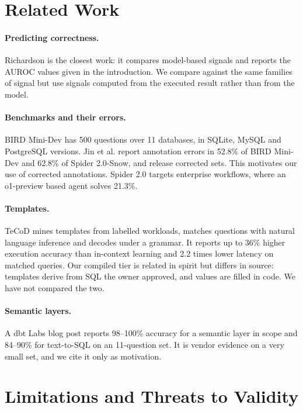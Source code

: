 \documentclass[10pt,twocolumn]{article}
\begin{document}
\section{Related Work}
\paragraph{Predicting correctness.} Richardson \cite{richardson2026} is the closest work: it compares model-based signals and reports the AUROC values given in the introduction. We compare against the same families of signal but use signals computed from the executed result rather than from the model.

\paragraph{Benchmarks and their errors.} BIRD Mini-Dev \cite{birdminidev} has 500 questions over 11 databases, in SQLite, MySQL and PostgreSQL versions. Jin et al. \cite{jin2026} report annotation errors in 52.8\% of BIRD Mini-Dev and 62.8\% of Spider 2.0-Snow, and release corrected sets. This motivates our use of corrected annotations. Spider 2.0 \cite{lei2025} targets enterprise workflows, where an o1-preview based agent solves 21.3\%.

\paragraph{Templates.} TeCoD \cite{jivani2026} mines templates from labelled workloads, matches questions with natural language inference and decodes under a grammar. It reports up to 36\% higher execution accuracy than in-context learning and 2.2 times lower latency on matched queries. Our compiled tier is related in spirit but differs in source: templates derive from SQL the owner approved, and values are filled in code. We have not compared the two.

\paragraph{Semantic layers.} A dbt Labs blog post \cite{dbt2026blog} reports 98--100\% accuracy for a semantic layer in scope and 84--90\% for text-to-SQL on an 11-question set. It is vendor evidence on a very small set, and we cite it only as motivation.

\section{Limitations and Threats to Validity}\label{sec:limits}
\end{document}
